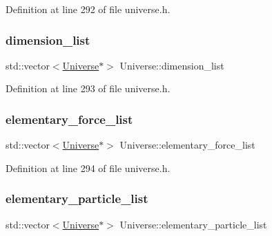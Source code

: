 Definition at line 292 of file universe.\+h.

\mbox{\label{class_universe_a159461f7098c3a30274f54c8acff6eac}} 
\subsubsection{\texorpdfstring{dimension\+\_\+list}{dimension\_list}}
{\footnotesize\ttfamily std\+::vector$<$\mbox{\hyperlink{class_universe}{Universe}}$\ast$$>$ Universe\+::dimension\+\_\+list\hspace{0.3cm}{\ttfamily [protected]}}



Definition at line 293 of file universe.\+h.

\mbox{\label{class_universe_a015b19f6d5ad84ebaa9e3e7c8352389c}} 
\subsubsection{\texorpdfstring{elementary\+\_\+force\+\_\+list}{elementary\_force\_list}}
{\footnotesize\ttfamily std\+::vector$<$\mbox{\hyperlink{class_universe}{Universe}}$\ast$$>$ Universe\+::elementary\+\_\+force\+\_\+list\hspace{0.3cm}{\ttfamily [protected]}}



Definition at line 294 of file universe.\+h.

\mbox{\label{class_universe_aeb2e63cf49f0b5595e6c15109863bd3b}} 
\subsubsection{\texorpdfstring{elementary\+\_\+particle\+\_\+list}{elementary\_particle\_list}}
{\footnotesize\ttfamily std\+::vector$<$\mbox{\hyperlink{class_universe}{Universe}}$\ast$$>$ Universe\+::elementary\+\_\+particle\+\_\+list\hspace{0.3cm}{\ttfamily [protected]}}



